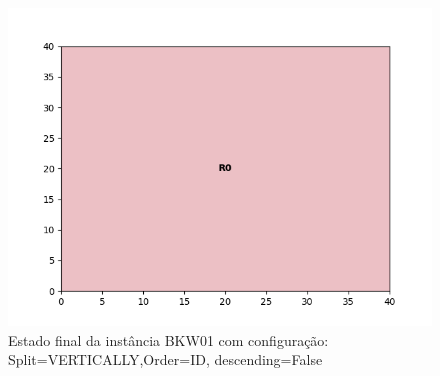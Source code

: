 \begin{figure}[H]
    \centering
    \caption[]{Estado final da instância BKW01 com configuração: Split=VERTICALLY,Order=ID, descending=False}
    \label{fig:bkw01-vertically-id-false}
    \includegraphics[scale=0.5]{output/figures/bkw/bkw01/vertically/id/false/00}
\end{figure}